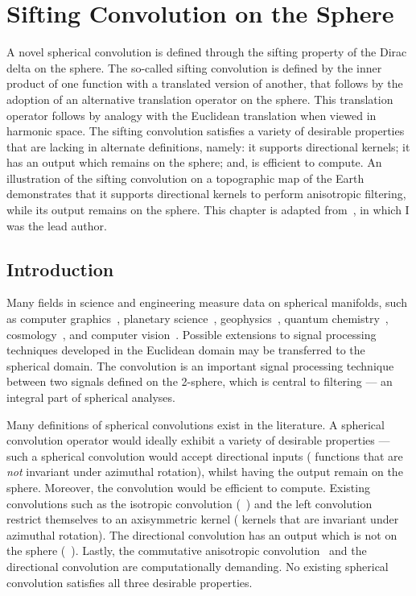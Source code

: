 \chapter{Sifting Convolution on the Sphere}\label{sec:chapter3}

A novel spherical convolution is defined through the sifting property of the Dirac delta on the sphere.
The so-called sifting convolution is defined by the inner product of one function with a translated version of another, that follows by the adoption of an alternative translation operator on the sphere.
This translation operator follows by analogy with the Euclidean translation when viewed in harmonic space.
The sifting convolution satisfies a variety of desirable properties that are lacking in alternate definitions, namely: it supports directional kernels; it has an output which remains on the sphere; and, is efficient to compute.
An illustration of the sifting convolution on a topographic map of the Earth demonstrates that it supports directional kernels to perform anisotropic filtering, while its output remains on the sphere.
This chapter is adapted from~\cite{Roddy2021}, in which I was the lead author.

\section{Introduction}

Many fields in science and engineering measure data on spherical manifolds, such as computer graphics~\cite{Ramamoorthi2004}, planetary science~\cite{Turcotte1981}, geophysics~\cite{Simons2006}, quantum chemistry~\cite{Choi1999}, cosmology~\cite{Bennett1996}, and computer vision~\cite{Cohen2018,Esteves2020,Cobb2021}.
Possible extensions to signal processing techniques developed in the Euclidean domain may be transferred to the spherical domain.
The convolution is an important signal processing technique between two signals defined on the 2-sphere, which is central to filtering --- an integral part of spherical analyses.

Many definitions of spherical convolutions exist in the literature.
A spherical convolution operator would ideally exhibit a variety of desirable properties --- such a spherical convolution would accept directional inputs (\ie{} functions that are \emph{not} invariant under azimuthal rotation), whilst having the output remain on the sphere.
Moreover, the convolution would be efficient to compute.
Existing convolutions such as the isotropic convolution (\eg{}~\cite{McEwen2007,Wei2011,Kennedy2011}) and the left convolution~\cite{Kennedy2011,Driscoll1994} restrict themselves to an axisymmetric kernel (\ie{} kernels that are invariant under azimuthal rotation).
The directional convolution has an output which is not on the sphere (\eg{}~\cite{McEwen2007,Wandelt2001}).
Lastly, the commutative anisotropic convolution~\cite{Sadeghi2012,Khalid2012} and the directional convolution are computationally demanding.
No existing spherical convolution satisfies all three desirable properties.

